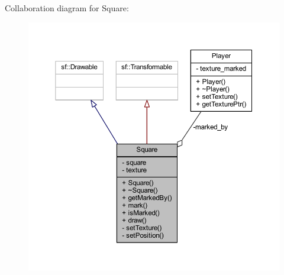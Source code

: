 Collaboration diagram for Square\+:
\nopagebreak
\begin{figure}[H]
\begin{center}
\leavevmode
\includegraphics[width=350pt]{class_square__coll__graph}
\end{center}
\end{figure}
